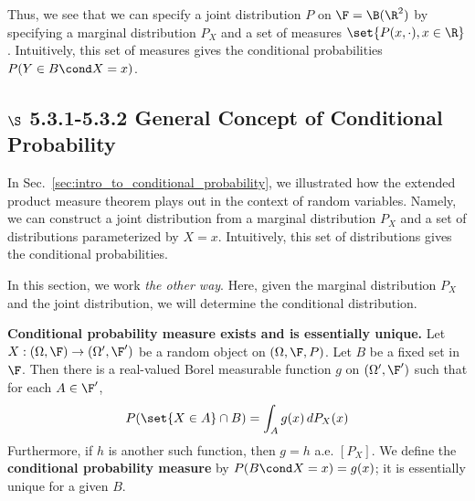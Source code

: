 \documentclass{article} %
\begin{document}
Thus, we see that we can specify a joint distribution $P$ on $\F=\B(\R^2)$ by specifying a marginal distribution $P_X$ and a set of measures $\set{P(x,\cdot), x \in \R}$. Intuitively, this set of measures gives the conditional probabilities $P(Y \in B \cond X = x)$. 
%

\subsection{$\S$ 5.3.1-5.3.2 General Concept of Conditional Probability}

In Sec.~\ref{sec:intro_to_conditional_probability}, we illustrated how the extended product measure theorem plays out in the context of random variables.  Namely, we can construct a joint distribution from a marginal distribution $P_X$ and a set of distributions parameterized by $X=x$.  Intuitively, this set of distributions gives the conditional probabilities.

In this section, we work \textit{the other way}.  Here, given the marginal distribution  $P_X$ and the joint distribution, we will determine the conditional distribution.


\begin{theorem}\textbf{Conditional probability measure exists and is essentially unique.}
Let $X: (\Omega, \F) \to  (\Omega', \F')$ be a random object on $(\Omega, \F, P)$.  Let $B$ be a fixed set in $\F$.   Then there is a real-valued Borel measurable function $g$ on $(\Omega', \F')$ such that for each $A \in \F'$, 
\begin{align}
P( \set{X \in A} \cap B) = \int_A g(x) \, dP_X(x)
\label{eqn:existence_of_conditional_probability_measure}	
\end{align}
Furthermore, if $h$ is another such function, then $g=h$ a.e. $[P_X]$.  We define the \textbf{conditional probability measure} by $P(B \cond X=x) = g(x)$; it is essentially unique \textnormal{for a given $B$}.
\label{thm:existence_of_conditional_probability_measure}
\end{theorem}
\end{document}
